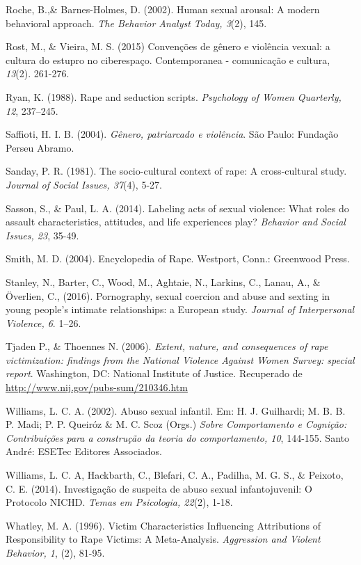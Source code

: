 \hangindent=25pt
\noindent Roche, B.,\& Barnes-Holmes, D. (2002). Human sexual arousal: A modern behavioral approach. \textit{The Behavior Analyst Today, 3}(2), 145.

\hangindent=25pt
\noindent Rost, M., \& Vieira, M. S. (2015) Convenções de gênero e violência vexual: a cultura do estupro no ciberespaço. Contemporanea - comunicação e cultura, \textit{13}(2). 261-276.

\hangindent=25pt
\noindent Ryan, K. (1988). Rape and seduction scripts. \textit{Psychology of Women Quarterly, 12}, 237–245.

\hangindent=25pt
\noindent Saffioti, H. I. B. (2004). \textit{Gênero, patriarcado e violência}. São Paulo: Fundação Perseu Abramo.

\hangindent=25pt
\noindent Sanday, P. R. (1981). The socio-cultural context of rape: A cross-cultural study. \textit{Journal of Social Issues, 37}(4), 5-27.

\hangindent=25pt
\noindent Sasson, S., \& Paul, L. A. (2014). Labeling acts of sexual violence: What roles do assault characteristics, attitudes, and life experiences play? \textit{Behavior and Social Issues, 23}, 35-49.

\hangindent=25pt
\noindent Smith, M. D. (2004). Encyclopedia of Rape. Westport, Conn.: Greenwood Press.

\hangindent=25pt
\noindent Stanley, N., Barter, C., Wood, M., Aghtaie, N., Larkins, C., Lanau, A., \& Överlien, C., (2016). Pornography, sexual coercion and abuse and sexting in young people’s intimate relationships: a European study. \textit{Journal of Interpersonal Violence, 6}. 1–26.

\hangindent=25pt
\noindent Tjaden P., \& Thoennes N. (2006). \textit{Extent, nature, and consequences of rape victimization: findings from the National Violence Against Women Survey: special report}. Washington, DC: National Institute of Justice. Recuperado de \url{http://www.nij.gov/pubs-sum/210346.htm}

\hangindent=25pt
\noindent Williams, L. C. A. (2002). Abuso sexual infantil. Em: H. J. Guilhardi; M. B. B. P. Madi; P. P. Queiróz \& M. C. Scoz (Orgs.) \textit{Sobre Comportamento e Cognição: Contribuições para a construção da teoria do comportamento, 10}, 144-155. Santo André: ESETec Editores Associados.

\hangindent=25pt
\noindent Williams, L. C. A, Hackbarth, C., Blefari, C. A., Padilha, M. G. S., \& Peixoto, C. E. (2014). Investigação de suspeita de abuso sexual infantojuvenil: O Protocolo NICHD. \textit{Temas em Psicologia, 22}(2), 1-18.

\hangindent=25pt
\noindent Whatley, M. A. (1996). Victim Characteristics Influencing Attributions of Responsibility to Rape Victims: A Meta-Analysis. \textit{Aggression and Violent Behavior, 1}, (2), 81-95.

